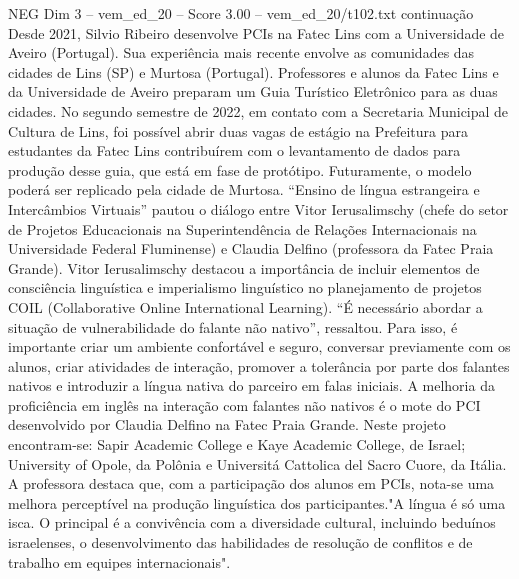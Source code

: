 \begin{textsample}{NEG Dim 3 – vem\_ed\_20 – Score 3.00 – vem\_ed\_20/t102.txt}  \label{ex:f3_neg_117}
continuação Desde 2021, Silvio Ribeiro desenvolve PCIs na Fatec Lins com a Universidade de Aveiro (Portugal).
Sua experiência mais recente envolve as comunidades das cidades de Lins (SP) e Murtosa (Portugal).
Professores e alunos da Fatec Lins e da Universidade de Aveiro preparam um Guia Turístico Eletrônico para as duas cidades.
No segundo semestre de 2022, em contato com a Secretaria Municipal de Cultura de Lins, foi possível abrir duas vagas de estágio na Prefeitura para estudantes da Fatec Lins contribuírem com o levantamento de dados para produção desse guia, que está em fase de protótipo.
Futuramente, o modelo poderá ser replicado pela cidade de Murtosa. “Ensino de língua estrangeira e Intercâmbios Virtuais” pautou o diálogo entre Vitor Ierusalimschy (chefe do setor de Projetos Educacionais na Superintendência de Relações Internacionais na Universidade Federal Fluminense) e Claudia Delfino (professora da Fatec Praia Grande).
Vitor Ierusalimschy destacou a importância de incluir elementos de consciência linguística e imperialismo linguístico no planejamento de projetos COIL (Collaborative Online International Learning). “É necessário abordar a situação de vulnerabilidade do falante não nativo”, ressaltou.
Para isso, é importante criar um ambiente confortável e seguro, conversar previamente com os alunos, criar atividades de interação, promover a tolerância por parte dos falantes nativos e introduzir a língua nativa do parceiro em falas iniciais.
A melhoria da proficiência em inglês na interação com falantes não nativos é o mote do PCI desenvolvido por Claudia Delfino na Fatec Praia Grande.
Neste projeto encontram-se: Sapir Academic College e Kaye Academic College, de Israel; University of Opole, da Polônia e Universitá Cattolica del Sacro Cuore, da Itália.
A professora destaca que, com a participação dos alunos em PCIs, nota-se uma melhora perceptível na produção linguística dos participantes."A língua é só uma isca.
O principal é a convivência com a diversidade cultural, incluindo beduínos israelenses, o desenvolvimento das habilidades de resolução de conflitos e de trabalho em equipes internacionais".

\end{textsample}

